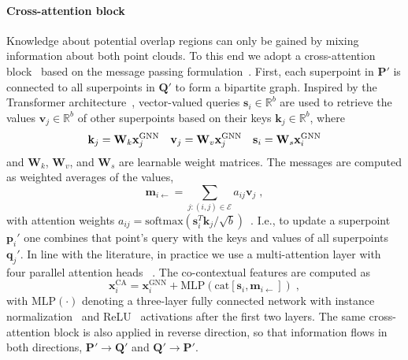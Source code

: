\paragraph{Cross-attention block} 
Knowledge about potential overlap regions can only be gained by mixing information about both point clouds. To this end we adopt a cross-attention block~\cite{sarlin2020superglue} based on the message passing formulation~\cite{gilmer2017neural}.
First, each superpoint in $\mathbf{P}'$ is connected to all superpoints in $\mathbf{Q}'$ to form a bipartite graph.
Inspired by the Transformer architecture~\cite{vaswani2017attention}, vector-valued queries $\mathbf{s}_i\!\in\!\mathbb{R}^{b}$ are used to retrieve the values $\mathbf{v}_j\!\in\!\mathbb{R}^{b}$ of other superpoints based on their keys
$\mathbf{k}_j\!\in\!\mathbb{R}^{b}$, where 
\begin{equation}
    \mathbf{k}_j = \mathbf{W}_k\mathbf{x}_j^{\mathrm{GNN}}\quad
    \mathbf{v}_j = \mathbf{W}_v\mathbf{x}_j^{\mathrm{GNN}}\quad
    \mathbf{s}_i = \mathbf{W}_s\mathbf{x}_i^{\mathrm{GNN}}\\
\end{equation}
and $\mathbf{W}_k$, $\mathbf{W}_v$, and $\mathbf{W}_s$ are learnable weight matrices.
The messages are computed as weighted averages of the values,
\begin{equation}
    \mathbf{m}_{i\leftarrow} = \sum_{j:(i,j)\in\mathcal{E}}a_{ij}\mathbf{v}_j\;,
\end{equation}
with attention weights $a_{ij} = \text{softmax}(\mathbf{s}^{T}_i\mathbf{k}_j / \sqrt{b})$~\cite{sarlin2020superglue}.
I.e., to update a superpoint $\mathbf{p}_i'$ one combines that point's query with the keys and values of all superpoints $\mathbf{q}_j'$.
In line with the literature, in practice we use a multi-attention layer with four parallel attention heads
~\cite{vaswani2017attention}.
The co-contextual features are computed as
\begin{equation}
    \mathbf{x}_i^{\text{CA}} = \mathbf{x}_i^{\mathrm{GNN}} + \mathrm{MLP}(\mathrm{cat}[\mathbf{s}_i, \mathbf{m}_{i\leftarrow}])\;,
\end{equation}
with $\mathrm{MLP}(\cdot)$ denoting a three-layer fully connected network with instance normalization~\cite{ulyanov2016instance} and ReLU~\cite{nair2010rectified} activations after the first two layers.
The same cross-attention block is also applied in reverse direction, so that information flows in both directions, $\mathbf{P}'\!\rightarrow\!\mathbf{Q}'$ and $\mathbf{Q}'\!\rightarrow\!\mathbf{P}'$.

